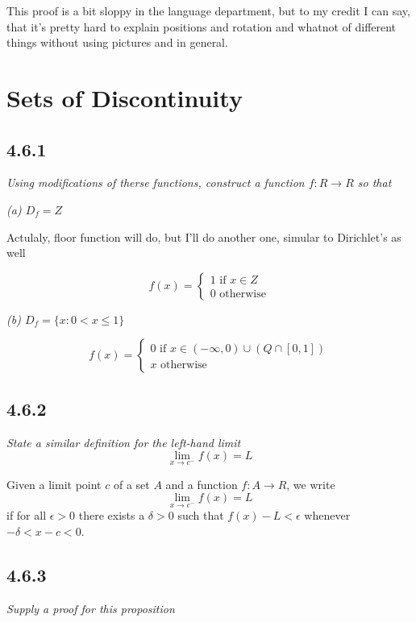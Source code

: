\documentclass[11pt,oneside,titlepage]{book}
\begin{document}
This proof is a bit sloppy in the language department, but to my credit
I can say, that it's pretty hard to explain positions and rotation and whatnot
of different things without using pictures and in general.

\section{Sets of Discontinuity}

\subsection*{4.6.1}
\textit{Using modifications of therse functions, construct a function
  $f: R \to R$ so that }

\textit{(a) $D_f = Z$}

Actulaly, floor function will do, but I'll do another one, simular to
Dirichlet's as well

\begin{equation}
  f(x) =
  \begin{cases}
    1 \text{ if } x \in Z \\
    0 \text{ otherwise}
  \end{cases}
\end{equation}

\textit{(b) $D_f = \{x: 0 < x \leq 1\}$}

\begin{equation}
  f(x) =
  \begin{cases}
    0 \text{ if } x \in (-\infty, 0) \cup (Q \cap [0, 1]) \\
    x \text { otherwise}
  \end{cases}
\end{equation}

\subsection*{4.6.2}
\textit{State a similar definition for the left-hand limit}
$$ \lim_{x \to c^-}{f(x)} = L$$

Given a limit point $c$ of a set $A$ and a function $f: A \to R$, we
write
$$ \lim_{x \to c^-}{f(x)} = L$$
if for all $\epsilon > 0$ there exists a $\delta > 0$ such that
$f(x) - L < \epsilon$ whenever $- \delta   < x - c < 0$.

\subsection*{4.6.3}
\textit{Supply a proof for this proposition}
\end{document}
